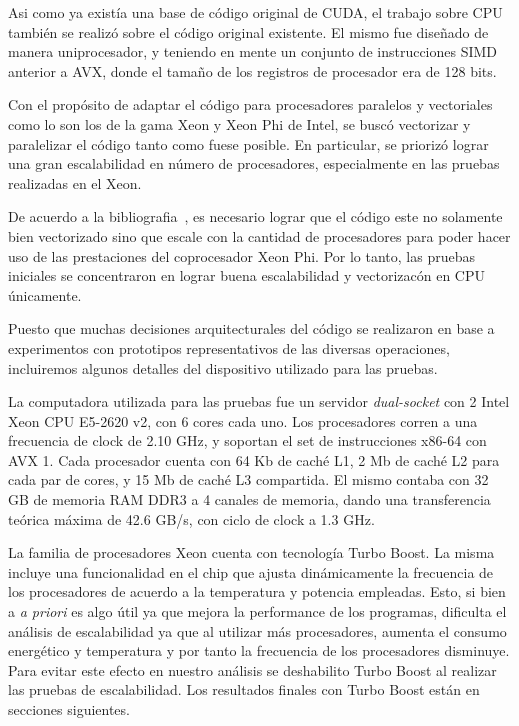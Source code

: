 Asi como ya exist\'ia una base de c\'odigo original de CUDA, el
trabajo sobre CPU tambi\'en se realiz\'o sobre el c\'odigo original
existente. El mismo fue dise\~nado de manera uniprocesador, y teniendo
en mente un conjunto de instrucciones SIMD anterior a AVX, donde el tama\~no
de los registros de procesador era de 128 bits.

Con el prop\'osito de adaptar el c\'odigo para procesadores
paralelos y vectoriales como lo son los de la gama Xeon y Xeon Phi de
Intel, se busc\'o vectorizar y paralelizar el c\'odigo tanto como fuese
posible. En particular, se prioriz\'o lograr una gran escalabilidad en
n\'umero de procesadores, especialmente en las pruebas realizadas en el
Xeon.

De acuerdo a la bibliografia~\cite{Jeffers}, es necesario lograr que
el c\'odigo este no solamente bien vectorizado sino que escale con la
cantidad de procesadores para poder hacer uso de las prestaciones del
coprocesador Xeon Phi. Por lo tanto, las pruebas iniciales se concentraron
en lograr buena escalabilidad y vectorizac\'on en CPU \'unicamente.

Puesto que muchas decisiones arquitecturales del c\'odigo se realizaron en
base a experimentos con prototipos representativos de las diversas operaciones,
incluiremos algunos detalles del dispositivo utilizado para las pruebas.

La computadora utilizada para las pruebas fue un servidor \textit{dual-socket}
con 2 Intel Xeon CPU E5-2620 v2, con 6 cores cada uno. Los
procesadores corren a una frecuencia de clock de 2.10 GHz, y soportan el set
de instrucciones x86-64 con AVX 1.
Cada procesador cuenta con 64 Kb de cach\'e L1, 2 Mb de cach\'e L2 para cada par de cores, y
15 Mb de cach\'e L3 compartida.
El mismo contaba con 32 GB de memoria RAM DDR3 a 4 canales de memoria, dando
una transferencia te\'orica m\'axima de 42.6 GB/s, con ciclo de clock a 1.3 GHz.

La familia de procesadores Xeon cuenta con tecnolog\'ia Turbo Boost. La misma
incluye una funcionalidad en el chip que ajusta din\'amicamente la frecuencia
de los procesadores de acuerdo a la temperatura y potencia empleadas. Esto, si
bien a \textit{a priori} es algo \'util ya que mejora la performance de los
programas, dificulta el an\'alisis de escalabilidad ya que al utilizar m\'as
procesadores, aumenta el consumo energ\'etico y temperatura y por tanto la
frecuencia de los procesadores disminuye. Para evitar este efecto en nuestro
an\'alisis se deshabilito Turbo Boost al realizar las pruebas de escalabilidad.
Los resultados finales con Turbo Boost est\'an en secciones siguientes.

